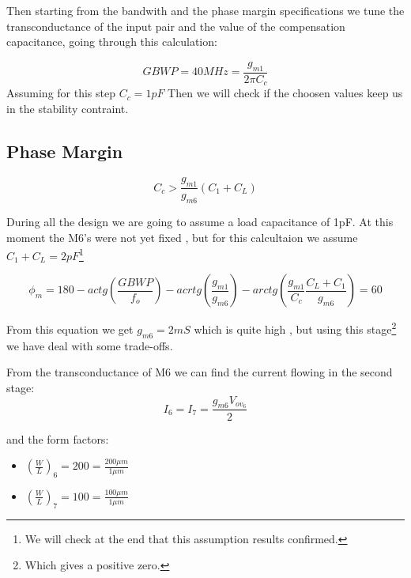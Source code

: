 Then starting from the bandwith and the phase margin specifications we tune the transconductance of the input pair and the value of the compensation capacitance, going through this calculation:

\begin{equation}
	GBWP=40MHz=\frac{g_{m1}}{2 \pi C_c}
\end{equation}
Assuming for this step $C_c = 1pF$
Then we will check if the choosen values keep us in the stability contraint.


\subsection{Phase Margin} %
\label{subsec:phase_margin}



\begin{equation}
	C_c> \frac{g_{m1}}{g_{m6}}(C_1+C_L)
\end{equation}

During all the design we are going to assume a load capacitance of 1pF.
At this moment the M6's were not yet fixed , but for this calcultaion we assume $C_1+C_L=2pF$\footnote{We will check at the end that this assumption results confirmed.}

\begin{equation}
	\phi_m=180- actg(\frac {GBWP} {f_o} )-acrtg(\frac { g_{m1} }{ g_{m6}})-arctg(\frac{g_{m1}} {C_c}\frac{C_L+C_1}{g_{m6}})=60 
\end{equation}

From this equation we get $g_{m6} = 2mS $ which is quite high , but using this stage\footnote{Which gives a positive zero.} we have deal with some trade-offs.

From the transconductance of M6 we can find the current flowing in the second stage:
\begin{equation}
  I_6=I_7= \frac{g_{m6}V_{ov_6}}{2}
\end{equation}

and the form factors:

\begin{itemize}
    \item $(\frac{W}{L})_6=200=\frac{200 \mu m}{1 \mu m}$
 
    \item $(\frac{W}{L})_7=100=\frac{100 \mu m}{1 \mu m}$
    
  \end{itemize}  

